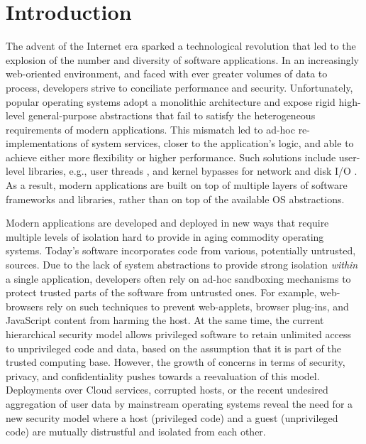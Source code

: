 \section{Introduction}

The advent of the Internet era sparked a technological revolution that led to the explosion of the number and diversity of software applications.
In an increasingly web-oriented environment, and faced with ever greater volumes of data to process, developers strive to conciliate performance and security.
Unfortunately, popular operating systems adopt a monolithic architecture and expose rigid high-level general-purpose abstractions that fail to satisfy the heterogeneous requirements of modern applications.
This mismatch led to ad-hoc re-implementations of system services, closer to the application's logic, and able to achieve either more flexibility or higher performance.
Such solutions include user-level libraries, e.g., user threads \cite{golang}, and kernel bypasses for network and disk I/O \cite{DBLP:conf/nsdi/NanavatiWW17,intel2014data,intel2016storage,BelayPKGKB14}.
As a result, modern applications are built on top of multiple layers of software frameworks and libraries, rather than on top of the available OS abstractions.

Modern applications are developed and deployed in new ways that require multiple levels of isolation hard to provide in aging commodity operating systems.
Today's software incorporates code from various, potentially untrusted, sources.
Due to the lack of system abstractions to provide strong isolation \emph{within} a single application, developers often rely on ad-hoc sandboxing mechanisms to protect trusted parts of the software from untrusted ones.
For example, web-browsers rely on such techniques to prevent web-applets, browser plug-ins, and JavaScript content from harming the host.
At the same time, the current hierarchical security model allows privileged software to retain unlimited access to unprivileged code and data, based on the assumption that it is part of the trusted computing base.
However, the growth of concerns in terms of security, privacy, and confidentiality pushes towards a reevaluation of this model.
Deployments over Cloud services, corrupted hosts, or the recent undesired aggregation of user data by mainstream operating systems \cite{microsoftspy} reveal the need for a new security model where a host (privileged code) and a guest (unprivileged code) are mutually distrustful and isolated from each other.

